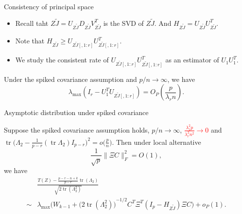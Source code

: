 \documentclass{beamer}
\DeclareMathOperator{\mytr}{tr}
\theoremstyle{plain}
\theoremstyle{definition}
\theoremstyle{remark}
\begin{document}
\begin{frame}{Consistency of principal space}
\begin{itemize}
    \item
        Recall taht  $Z\tilde{J}=U_{Z\tilde{J}}D_{Z\tilde{J}}V_{Z\tilde{J}}^T$ is the SVD of $Z\tilde{J}$. And $H_{Z\tilde{J}}=U_{Z\tilde{J}}U_{Z\tilde{J}}^T$.
    \item
        Note that $H_{Z\tilde{J}}\geq U_{Z\tilde{J}[,1:r]}U_{Z\tilde{J}[,1:r]}^T$.
    \item
    We study the consistent rate of
        $U_{Z\tilde{J}[,1:r]}U_{Z\tilde{J}[,1:r]}^T$ as an estimator of $U_1 U_1^T$.
\end{itemize}
    \begin{lemma}
        Under the spiked covariance assumption and $p/n\to \infty$, we have
        $$\lambda_{\max}(I_r- U_1^T U_{Z\tilde{J}[,1:r]})=O_P(\frac{p}{\lambda_r n}).$$
    \end{lemma}

\end{frame}
\begin{frame}{Asymptotic distribution under spiked covariance}
    \begin{theorem}

Suppose the spiked covariance assumption holds, $p/n\to \infty$,
        \textcolor{red}{$\frac{\lambda_1^2 p}{\lambda_r^2 n^2}\to 0$} and
$
\mytr\Big(\Lambda_2-\frac{1}{p-r}(\mytr \Lambda_2)I_{p-r}\Big)^2=o\big(\frac{p}{n}\big)
$.
Then under local alternative
\begin{equation*}
\frac{1}{\sqrt{p}}\|\Xi C\|_F^2=O(1),
\end{equation*}
we have
$$
\begin{aligned}
    &\frac{T(Z)-\frac{p-r-n+k}{p-r}\mytr(\Lambda_2)}{\sqrt{2\mytr (\Lambda_2^2)}}\\
    \sim&
\lambda_{\max}\Big(W_{k-1}+{\big(2\mytr (\Lambda_2^2)\big)}^{-1/2} C^T \Xi^T (I_p-H_{Z\tilde{J}})\Xi C\Big)
+o_P(1).
\end{aligned}
$$
    \end{theorem}
\end{frame}
\end{document}

